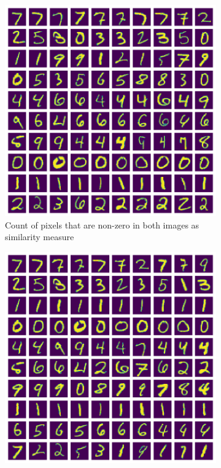\documentclass[10pt,a4paper, nocenter]{report}
\begin{document}
\begin{enumerate}
        \begin{figure}[h]
            \begin{center}
                \begin{subfigure}[b]{0.3\textwidth}
                    \centering
                    \includegraphics[width=\textwidth]{../../images/number_clustering_10_0norm.png}
                    \caption{Count of pixels that are non-zero in both images as similarity measure}
                    \label{fig:clustering_10_0norm}
                \end{subfigure}           
                \begin{subfigure}[b]{0.3\textwidth}
                    \centering
                    \includegraphics[width=\textwidth]{../../images/number_clustering_10_2norm.png}

\end{subfigure}
\end{center}
\end{figure}
\end{enumerate}
\end{document}
